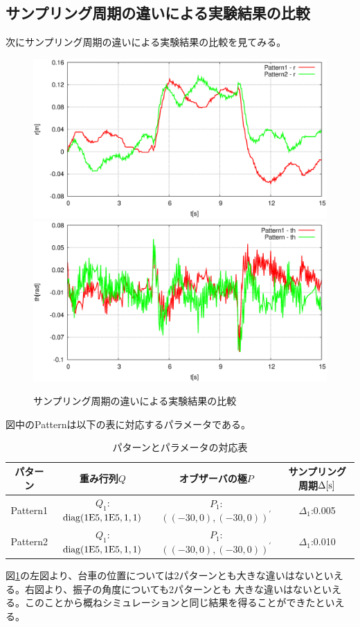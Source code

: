 	\subsection{サンプリング周期の違いによる実験結果の比較}
	次にサンプリング周期の違いによる実験結果の比較を見てみる。
	\begin{figure}[H]
		\centering
		\includegraphics[width=0.49\linewidth]{gazo/Compare_dt_R.eps}
		\includegraphics[width=0.49\linewidth]{gazo/Compare_dt_TH.eps}
		\caption{サンプリング周期の違いによる実験結果の比較}
		\label{image:comp_dt}
	\end{figure}
	図中のPatternは以下の表に対応するパラメータである。
	\begin{table}[H]
		\begin{center}
			\caption{パターンとパラメータの対応表}
			\medskip
			
			\begin{tabular}{|c|c|c|c|}\hline
				パターン & 重み行列$Q$ & オブザーバの極$P$ & サンプリング周期$\Delta[\rm{s}]$ \\ \hline\hline
				Pattern1 & $Q_1$:$\rm{diag}(1E5,1E5,1,1)$ & $P_1$:$((-30,0),(-30,0))^{'}$ & $\Delta_1$:0.005 \\ \hline
				Pattern2 & $Q_1$:$\rm{diag}(1E5,1E5,1,1)$ & $P_1$:$((-30,0),(-30,0))^{'}$ & $\Delta_1$:0.010 \\ \hline
			\end{tabular}
		\end{center}
		\label{table:huriage_control}
	\end{table}
	図\ref{image:comp_dt}の左図より、台車の位置については2パターンとも大きな違いはないといえる。右図より、振子の角度についても2パターンとも
	大きな違いはないといえる。このことから概ねシミュレーションと同じ結果を得ることができたといえる。
	\newpage
